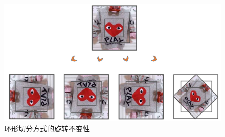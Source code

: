 \begin{figure}[h]
  \centering
  \includegraphics[width=1.0\linewidth]{Img/annular-vis.pdf}
  \caption{环形切分方式的旋转不变性}
  \label{fig:annular-vis}
\end{figure}
